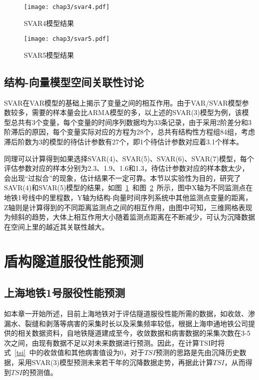 \begin{figure}[htb!]
    \centering
    \texttt{[image: chap3/svar4.pdf]}
    \caption{SVAR4模型结果}
    \label{fig:SVAR4模型结果}
\end{figure}

\begin{figure}[htb!]
    \centering
    \texttt{[image: chap3/svar5.pdf]}
    \caption{SVAR5模型结果}
    \label{fig:SVAR5模型结果}
\end{figure}

\subsection{结构-向量模型空间关联性讨论}

SVAR在VAR模型的基础上揭示了变量之间的相互作用。由于VAR/SVAR模型参数较多，需要的样本量会比ARMA模型的多，以上述的SVAR(3)模型为例，该模型总共有3个变量，每个变量的时间序列数据均为33条记录，由于采用2阶差分和3阶滞后的原因，每个变量实际对应的方程为28个，总共有结构性方程组84组，考虑滞后阶数为3的模型的待估计参数有27个，即1个待估计参数对应着3.1个样本。

同理可以计算得到如果选择SVAR(4)、SVAR(5)、SVAR(6)、SVAR(7)模型，每个评估参数对应的样本分别为2.3、1.9、1.6和1.3，待估计参数对应的样本数太少，会出现“过拟合”的现象，估计结果不一定可靠。本节以实验性为目的，研究了SAVR(4)和SVAR(5)模型的结果，如图~\ref{fig:SVAR4模型结果}~和图~\ref{fig:SVAR5模型结果}~所示，图中X轴为不同监测点在地铁1号线中的里程数，Y轴为结构-向量时间序列系统中其他监测点变量的距离，Z轴则是计算得到的不同距离监测点之间的相互作用，由图中可知，三维网格表现为倾斜的趋势，大体上相互作用大小随着监测点距离在不断减少，可认为沉降数据在空间上里的越近其关联性越大。

\section{盾构隧道服役性能预测}

\subsection{上海地铁1号服役性能预测}

如本章一开始所述，目前上海地铁对于评估隧道服役性能所需的数据，如收敛、渗漏水、裂缝和剥落等病害的采集时长以及采集频率较低，根据上海申通地铁公司提供的相关数据资料，自地铁隧道建成至今，收敛数据和病害数据的采集次数在3-5次之间，由现有数据不足以对未来数据进行预测。因此，在计算TSI时将式~\ref{tsi}~中的收敛值和其他病害值设为0，对于$TSI$预测的思路是先由沉降历史数据，采用SVAR(3)模型预测未来若干年的沉降数据走势，再据此计算$TSI$，从而得到$TSI$的预测值。

